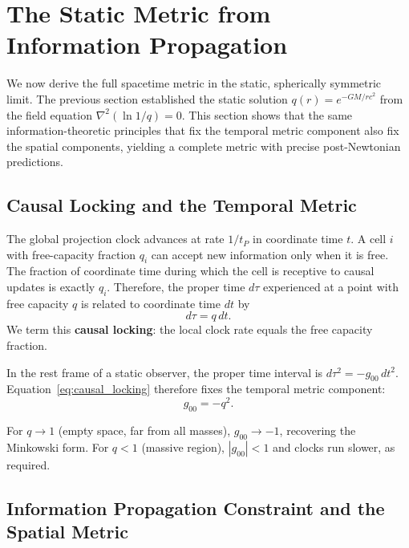 \section{The Static Metric from Information Propagation}
\label{sec:metric}

We now derive the full spacetime metric in the static, spherically symmetric limit.
The previous section established the static solution $q(r)=e^{-GM/rc^2}$ from the field equation $\nabla^2(\ln 1/q)=0$.
This section shows that the same information-theoretic principles that fix the temporal metric component also fix the spatial components, yielding a complete metric with precise post-Newtonian predictions.

\subsection{Causal Locking and the Temporal Metric}

The global projection clock advances at rate $1/t_P$ in coordinate time $t$.
A cell $i$ with free-capacity fraction $q_i$ can accept new information only when it is free.
The fraction of coordinate time during which the cell is receptive to causal updates is exactly $q_i$.
Therefore, the proper time $d\tau$ experienced at a point with free capacity $q$ is related to coordinate time $dt$ by
\begin{equation}
\boxed{d\tau = q\,dt}.
\label{eq:causal_locking}
\end{equation}
We term this \textbf{causal locking}: the local clock rate equals the free capacity fraction.

In the rest frame of a static observer, the proper time interval is $d\tau^2 = -g_{00}\,dt^2$.
Equation~\eqref{eq:causal_locking} therefore fixes the temporal metric component:
\begin{equation}
\boxed{g_{00} = -q^2}.
\label{eq:g00}
\end{equation}

For $q\to1$ (empty space, far from all masses), $g_{00}\to-1$, recovering the Minkowski form.
For $q<1$ (massive region), $|g_{00}|<1$ and clocks run slower, as required.

\subsection{Information Propagation Constraint and the Spatial Metric}

